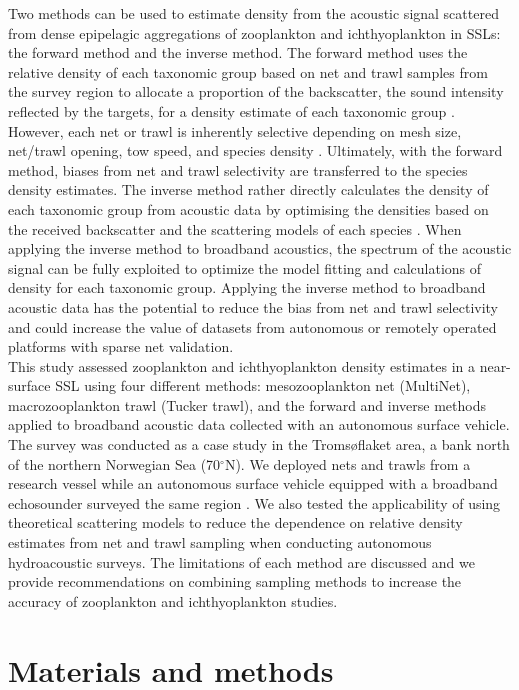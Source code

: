 Two methods can be used to estimate density from the acoustic signal scattered from dense epipelagic aggregations of zooplankton and ichthyoplankton in SSLs: the forward method and the inverse method. The forward method uses the relative density of each taxonomic group based on net and trawl samples from the survey region to allocate a proportion of the backscatter, the sound intensity reflected by the targets, for a density estimate of each taxonomic group \citep{Love1975, Simmonds2008}. However, each net or trawl is inherently selective \citep{Skjoldal2013} depending on mesh size, net/trawl opening, tow speed, and species density \citep{Pearcy1983, Battaglia2006, Moriarty2018}. Ultimately, with the forward method, biases from net and trawl selectivity are transferred to the species density estimates. The inverse method rather directly calculates the density of each taxonomic group from acoustic data by optimising the densities based on the received backscatter and the scattering models of each species \citep{Holliday1977}. When applying the inverse method to broadband acoustics, the spectrum of the acoustic signal can be fully exploited to optimize the model fitting and calculations of density for each taxonomic group. Applying the inverse method to broadband acoustic data has the potential to reduce the bias from net and trawl selectivity and could increase the value of datasets from autonomous or remotely operated platforms with sparse net validation. \\
This study assessed zooplankton and ichthyoplankton density estimates in a near-surface SSL using four different methods: mesozooplankton net (MultiNet), macrozooplankton trawl (Tucker trawl), and the forward and inverse methods applied to broadband acoustic data collected with an autonomous surface vehicle. The survey was conducted as a case study in the Tromsøflaket area, a bank north of the northern Norwegian Sea (70$^{\circ}$N). We deployed nets and trawls from a research vessel while an autonomous surface vehicle equipped with a broadband echosounder surveyed the same region \citep{Camus2019}. We also tested the applicability of using theoretical scattering models \citep{Chu1999, Khodabandeloo2021} to reduce the dependence on relative density estimates from net and trawl sampling when conducting autonomous hydroacoustic surveys. The limitations of each method are discussed and we provide recommendations on combining sampling methods to increase the accuracy of zooplankton and ichthyoplankton studies.


\section{Materials and methods}
